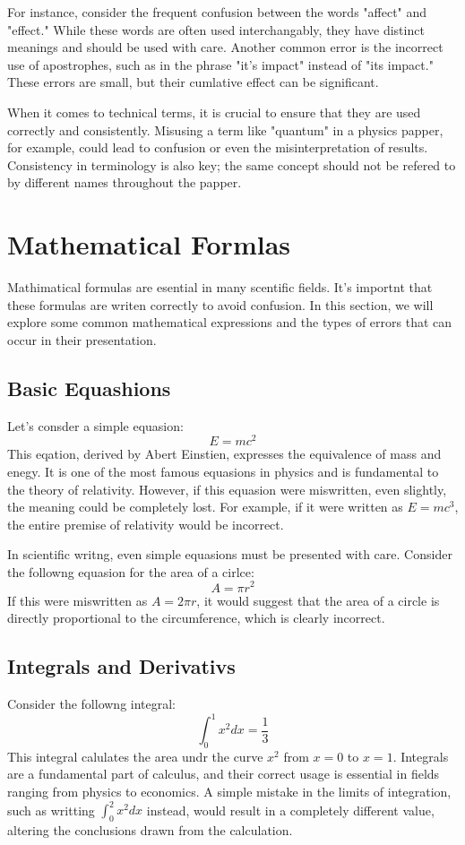 \documentclass{article}
\begin{document}
For instance, consider the frequent confusion between the words "affect" and "effect." While these words are often used interchangably, they have distinct meanings and should be used with care. Another common error is the incorrect use of apostrophes, such as in the phrase "it's impact" instead of "its impact." These errors are small, but their cumlative effect can be significant.

When it comes to technical terms, it is crucial to ensure that they are used correctly and consistently. Misusing a term like "quantum" in a physics papper, for example, could lead to confusion or even the misinterpretation of results. Consistency in terminology is also key; the same concept should not be refered to by different names throughout the papper.

\section{Mathematical Formlas}
Mathimatical formulas are esential in many scentific fields. It's importnt that these formulas are writen correctly to avoid confusion. In this section, we will explore some common mathematical expressions and the types of errors that can occur in their presentation.

\subsection{Basic Equashions}
Let's consder a simple equasion:
\begin{equation}
    E = mc^2
\end{equation}
This eqation, derived by Abert Einstien, expresses the equivalence of mass and enegy. It is one of the most famous equasions in physics and is fundamental to the theory of relativity. However, if this equasion were miswritten, even slightly, the meaning could be completely lost. For example, if it were written as $E = mc^3$, the entire premise of relativity would be incorrect.

In scientific writng, even simple equasions must be presented with care. Consider the followng equasion for the area of a cirlce:
\begin{equation}
    A = \pi r^2
\end{equation}
If this were miswritten as $A = 2\pi r$, it would suggest that the area of a circle is directly proportional to the circumference, which is clearly incorrect.

\subsection{Integrals and Derivativs}
Consider the followng integral:
\begin{equation}
    \int_0^1 x^2 dx = \frac{1}{3}
\end{equation}
This integral calulates the area undr the curve $x^2$ from $x=0$ to $x=1$. Integrals are a fundamental part of calculus, and their correct usage is essential in fields ranging from physics to economics. A simple mistake in the limits of integration, such as writting $\int_0^2 x^2 dx$ instead, would result in a completely different value, altering the conclusions drawn from the calculation.
\end{document}
